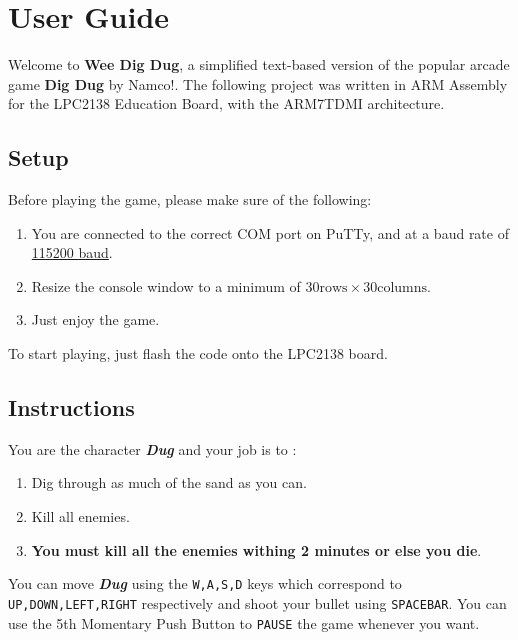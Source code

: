 \section{User Guide}

Welcome to \textbf{Wee Dig Dug}, a simplified text-based version of the popular
arcade game \textbf{Dig Dug} by Namco!.  The following project was written in
ARM Assembly for the LPC2138 Education Board, with the ARM7TDMI architecture.

  \subsection{Setup}

  Before playing the game, please make sure of the following:

  \begin{enumerate} 
    \item You are connected to the correct COM port on PuTTy,
          and at a baud rate of \underline{115200 baud}.
    \item Resize the console window to a minimum of $ 30 \text{rows} \times 30 \text{columns} $.
    \item Just enjoy the game.
  \end{enumerate}

  To start playing, just flash the code onto the LPC2138 board.

  \subsection{Instructions}

  You are the character \textbf{\textit{Dug}} and your job is to :

  \begin{enumerate}
    \item Dig through as much of the sand as you can.
    \item Kill all enemies.  
    \item \textbf{You must kill all the enemies withing 2 minutes or else you die}.  
  \end{enumerate}

  You can move \textbf{\textit{Dug}} using the \texttt{W,A,S,D} keys which correspond to 
  \texttt{UP,DOWN,LEFT,RIGHT} respectively and shoot your bullet using \texttt{SPACEBAR}.
  You can use the 5th Momentary Push Button to \texttt{PAUSE} the game whenever you want.


